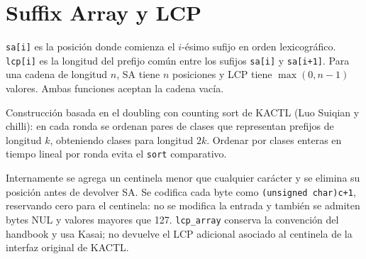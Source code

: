 \section{Suffix Array y LCP}

\texttt{sa[i]} es la posición donde comienza el $i$-ésimo sufijo en orden
lexicográfico. \texttt{lcp[i]} es la longitud del prefijo común entre los
sufijos \texttt{sa[i]} y \texttt{sa[i+1]}. Para una cadena de longitud $n$,
SA tiene $n$ posiciones y LCP tiene $\max(0,n-1)$ valores. Ambas funciones
aceptan la cadena vacía.

Construcción basada en el doubling con counting sort de KACTL (Luo Suiqian y
chilli): en cada ronda se ordenan pares de clases que representan prefijos de
longitud $k$, obteniendo clases para longitud $2k$. Ordenar por clases enteras
en tiempo lineal por ronda evita el \texttt{sort} comparativo.

Internamente se agrega un centinela menor que cualquier carácter y se elimina
su posición antes de devolver SA. Se codifica cada byte como
\texttt{(unsigned char)c+1}, reservando cero para el centinela: no se modifica
la entrada y también se admiten bytes NUL y valores mayores que 127.
\texttt{lcp\_array} conserva la convención del handbook y usa Kasai; no devuelve
el LCP adicional asociado al centinela de la interfaz original de KACTL.


